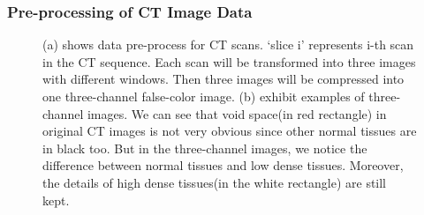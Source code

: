 \documentclass[journal]{IEEEtran}
\begin{document}
\subsubsection{Pre-processing of CT Image Data}
\label{ctimagedata}
\begin{figure}[htbp]
    \centering

    \centering
    \caption{(a) shows data pre-process for CT scans. `slice i' represents i-th scan in the CT sequence. Each scan will be transformed into three images with different windows. Then three images will be compressed into one three-channel false-color image.
    (b) exhibit examples of three-channel images. We can see that void space(in red rectangle) in original CT images is not very obvious since other normal tissues are in black too. But in the three-channel images, we notice the difference between normal tissues and low dense tissues. Moreover, the details of high dense tissues(in the white rectangle) are still kept.
    }
    \label{3channel}
    \end{figure}
\end{document}
